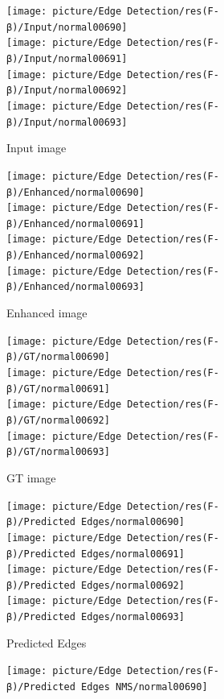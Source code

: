 \documentclass[a4paper]{ctexart}
\begin{document}
		\begin{figure}[htbp]
			\centering
			\begin{subfigure}{0.16\textwidth}
				\texttt{[image: picture/Edge Detection/res(F-β)/Input/normal00690]} \\
				\texttt{[image: picture/Edge Detection/res(F-β)/Input/normal00691]} \\
				\texttt{[image: picture/Edge Detection/res(F-β)/Input/normal00692]} \\
				\texttt{[image: picture/Edge Detection/res(F-β)/Input/normal00693]}
				\caption{Input image}
			\end{subfigure}
			\begin{subfigure}{0.16\textwidth}
				\texttt{[image: picture/Edge Detection/res(F-β)/Enhanced/normal00690]} \\
				\texttt{[image: picture/Edge Detection/res(F-β)/Enhanced/normal00691]} \\
				\texttt{[image: picture/Edge Detection/res(F-β)/Enhanced/normal00692]} \\
				\texttt{[image: picture/Edge Detection/res(F-β)/Enhanced/normal00693]}
				\caption{Enhanced image}
			\end{subfigure}
			\begin{subfigure}{0.16\textwidth}
				\texttt{[image: picture/Edge Detection/res(F-β)/GT/normal00690]} \\
				\texttt{[image: picture/Edge Detection/res(F-β)/GT/normal00691]} \\
				\texttt{[image: picture/Edge Detection/res(F-β)/GT/normal00692]} \\
				\texttt{[image: picture/Edge Detection/res(F-β)/GT/normal00693]}
				\caption{GT image}
			\end{subfigure}
			\begin{subfigure}{0.16\textwidth}
				\texttt{[image: picture/Edge Detection/res(F-β)/Predicted Edges/normal00690]} \\
				\texttt{[image: picture/Edge Detection/res(F-β)/Predicted Edges/normal00691]} \\
				\texttt{[image: picture/Edge Detection/res(F-β)/Predicted Edges/normal00692]} \\
				\texttt{[image: picture/Edge Detection/res(F-β)/Predicted Edges/normal00693]}
				\caption{Predicted Edges}
			\end{subfigure}
			\begin{subfigure}{0.16\textwidth}
				\texttt{[image: picture/Edge Detection/res(F-β)/Predicted Edges NMS/normal00690]} \\

\end{subfigure}
\end{figure}
\end{document}
